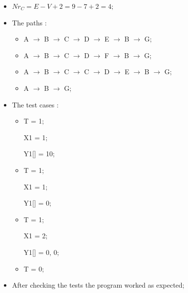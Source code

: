 \begin{itemize}
	\item $Nr_{C} = E - V + 2 = 9 - 7 + 2 = 4;$
	\item The paths : 
		  \begin{itemize}
		      \item A $\rightarrow$ B $\rightarrow$ C $\rightarrow$ D $\rightarrow$ E $\rightarrow$ B $\rightarrow$ G;
		      \item A $\rightarrow$ B $\rightarrow$ C $\rightarrow$ D $\rightarrow$ F $\rightarrow$ B $\rightarrow$ G;
		      \item A $\rightarrow$ B $\rightarrow$ C $\rightarrow$ C $\rightarrow$ D $\rightarrow$ E $\rightarrow$ B $\rightarrow$ G;
		      \item A $\rightarrow$ B $\rightarrow$ G;
		  \end{itemize}
	\item The test cases : 
		  \begin{itemize}
		  	  \item T = 1; 
		  	  
		  	  		X1 = 1; 
		  	  
		  	  		Y1[] = {10}; 
		  	  		
		  	  \item T = 1; 
		  	  
			  	    X1 = 1; 
			  	  
			  	    Y1[] = {0};
			  	    
			  \item T = 1; 
			  
			  		X1 = 2; 
			  
	   			    Y1[] = {0, 0}; 
	   			    
	   		  \item T = 0;
		  	  
		  \end{itemize}
	  
	\item After checking the tests the program worked as expected;	 	
	
\end{itemize}
